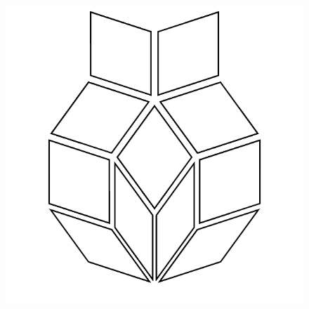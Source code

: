 \documentclass[17pt]{extreport}
\begin{document}

	\begin{figure}
		\centering
		\includegraphics[width=6.25in]{imageserver/uploadimages/pi.png}
	\end{figure}
\end{document}
